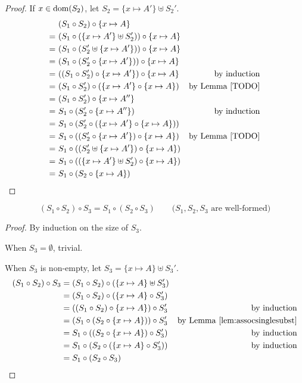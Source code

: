 \begin{proof}
If $x\in \mathop{\mathrm{dom}}(S_2)$, let $S_2=\{x\mapsto A'\}\uplus S_2'$.
\begin{align*}
 &~ (S_1\circ S_2) \circ \{x\mapsto A\} \\
=&~ (S_1\circ(\{x\mapsto A'\}\uplus S_2')) \circ \{x\mapsto A\} \\
=&~ (S_1\circ(S_2'\uplus\{x\mapsto A'\})) \circ \{x\mapsto A\} \\
=&~ (S_1\circ(S_2'\circ\{x\mapsto A'\})) \circ \{x\mapsto A\} \\
=&~ ((S_1\circ S_2')\circ\{x\mapsto A'\}) \circ \{x\mapsto A\}
	& \text{by induction} \\
=&~ (S_1\circ S_2')\circ(\{x\mapsto A'\} \circ \{x\mapsto A\})
	& \text{by Lemma \ref{TODO}} \\
=&~ (S_1\circ S_2')\circ \{x\mapsto A''\} \\
=&~ S_1 \circ (S_2'\circ \{x\mapsto A''\} )
	& \text{by induction} \\
=&~ S_1 \circ (S_2'\circ (\{x\mapsto A'\} \circ \{x\mapsto A\})) \\
=&~ S_1 \circ ((S_2'\circ \{x\mapsto A'\}) \circ \{x\mapsto A\})
	& \text{by Lemma \ref{TODO}} \\
=&~ S_1 \circ ((S_2'\uplus \{x\mapsto A'\}) \circ \{x\mapsto A\}) \\
=&~ S_1 \circ ((\{x\mapsto A'\}\uplus S_2') \circ \{x\mapsto A\}) \\
=&~ S_1 \circ (S_2 \circ \{x\mapsto A\})
\end{align*}


\end{proof}

\begin{theorem}
	\[(S_1\circ S_2) \circ S_3 = S_1 \circ (S_2 \circ S_3)
	\qquad\text{($S_1, S_2, S_3$ are well-formed)}
	\]
\end{theorem}
\begin{proof}
By induction on the size of $S_3$.

When $S_3=\emptyset$, trivial.

When $S_3$ is non-empty, let $S_3=\{x\mapsto A\}\uplus S_3'$.
\begin{align*}
(S_1\circ S_2) \circ S_3
	&= (S_1\circ S_2) \circ (\{x\mapsto A\}\uplus S_3') \\
	&= (S_1\circ S_2) \circ (\{x\mapsto A\} \circ S_3') \\
	&= ((S_1\circ S_2) \circ \{x\mapsto A\}) \circ S_3'
	& \text{by induction} \\
	&= (S_1\circ(S_2 \circ \{x\mapsto A\})) \circ S_3'
	& \text{by Lemma \ref{lem:assocsinglesubst}} \\
	&= S_1\circ((S_2 \circ \{x\mapsto A\}) \circ S_3')
	& \text{by induction} \\
	&= S_1\circ(S_2 \circ(\{x\mapsto A\} \circ S_3'))
	& \text{by induction} \\
	&= S_1 \circ (S_2 \circ S_3)
\end{align*}
\end{proof}


